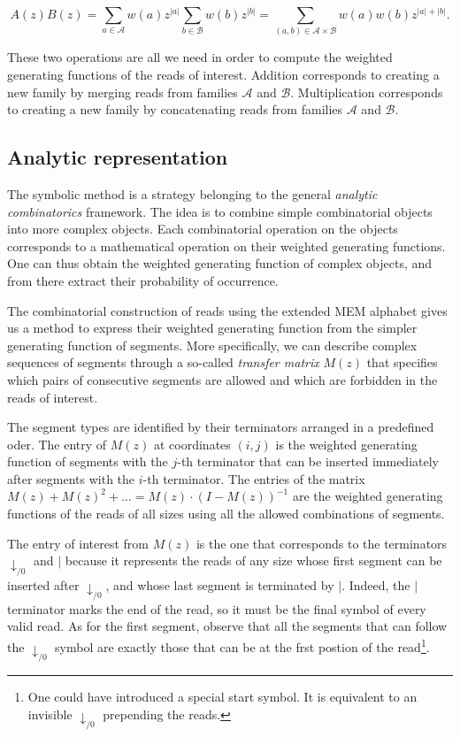 \documentclass{article}
\begin{document}
\begin{equation*}
A(z)B(z) =
\sum_{a\in \mathcal{A}}w(a)z^{|a|} \sum_{b\in \mathcal{B}}w(b)z^{|b|}
= \sum_{(a,b) \in \mathcal{A} \times \mathcal{B}} w(a)w(b)z^{|a|+|b|}.
\end{equation*}

These two operations are all we need in order to compute the weighted
generating functions of the reads of interest. Addition corresponds to
creating a new family by merging reads from families $\mathcal{A}$ and
$\mathcal{B}$. Multiplication corresponds to creating a new family by
concatenating reads from families $\mathcal{A}$ and $\mathcal{B}$.

\subsection{Analytic representation}

The symbolic method is a strategy belonging to the general \emph{analytic
combinatorics} framework. The idea is to combine simple combinatorial
objects into more complex objects. Each combinatorial operation on the
objects corresponds to a mathematical operation on their weighted
generating functions. One can thus obtain the weighted generating function
of complex objects, and from there extract their probability of
occurrence.

The combinatorial construction of reads using the extended MEM alphabet
gives us a method to express their weighted generating function from the
simpler generating function of segments. More specifically, we can
describe complex sequences of segments through a so-called \emph{transfer
matrix} $M(z)$ that specifies which pairs of consecutive segments are
allowed and which are forbidden in the reads of interest.

The segment types are identified by their terminators arranged in a
predefined oder. The entry of $M(z)$ at coordinates $(i,j)$ is the
weighted generating function of segments with the $j$-th terminator that
can be inserted immediately after segments with the $i$-th terminator. The
entries of the matrix $M(z) + M(z)^2 + \ldots = M(z) \cdot (I-M(z))^{-1}$
are the weighted generating functions of the reads of all sizes using all
the allowed combinations of segments.

The entry of interest from $M(z)$ is the one that corresponds to the
terminators $\downarrow_{/0}$ and $|$ because it represents the reads of
any size whose first segment can be inserted after $\downarrow_{/0}$, and
whose last segment is terminated by $|$. Indeed, the $|$ terminator marks
the end of the read, so it must be the final symbol of every valid read.
As for the first segment, observe that all the segments that can follow
the $\downarrow_{/0}$ symbol are exactly those that can be at the frst
postion of the read\footnote{One could have introduced a special start
symbol. It is equivalent to an invisible $\downarrow_{/0}$ prepending
the reads.}.
\end{document}
